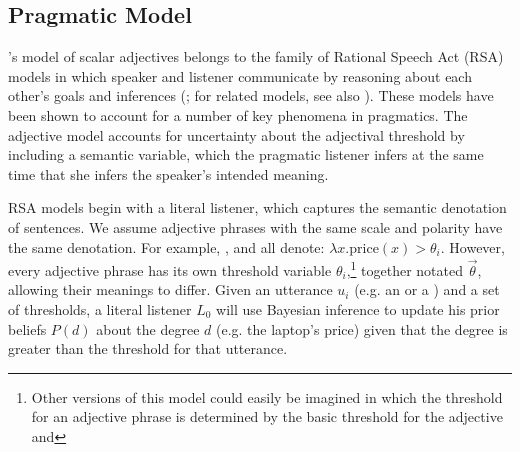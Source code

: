 \begin{appendices}



\section{Pragmatic Model \label{app:model}}

's model of scalar adjectives belongs to the family of Rational Speech Act (RSA) models in which speaker and listener communicate by  reasoning about each other's goals and inferences (; for related models, see also ). 
These models have been shown to account for a number of key phenomena in pragmatics. The adjective model accounts for uncertainty about the adjectival threshold by including a semantic variable, which the pragmatic listener infers at the same time that she infers the speaker's intended meaning. 

RSA models begin with a literal listener, which captures the semantic denotation of sentences. 
We assume adjective phrases with the same scale and polarity have the same denotation. For example, ,  and  all denote: $\lambda x . \text{price}(x) > \theta_i$. %
However, every adjective phrase has its own threshold variable $\theta_i$,\footnote{%
%
Other versions of this model could easily be imagined in which the threshold for an adjective phrase is determined by the basic threshold for the adjective and 
%
} together notated $\vec{\theta}$, allowing their meanings to differ.
Given an utterance $u_i$ (e.g. an  or a ) and a set of thresholds, a literal listener $L_0$ will use Bayesian inference to update his prior beliefs $P(d)$ about the degree $d$ (e.g. the laptop's price) given that the degree is greater than the threshold for that utterance.


\end{appendices}
